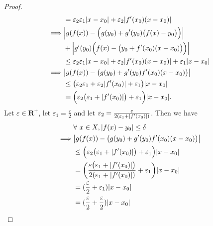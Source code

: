 \begin{proof}
\begin{align*}
                 & = \varepsilon_2 \varepsilon_1 \abs*{x - x_0} + \varepsilon_2 \abs*{f'(x_0)(x - x_0)}                                   \\
        \implies & \abs*{g(f(x)) - \Big(g(y_0) + g'(y_0)\big(f(x) - y_0\big)\Big)}                                                        \\
                 & + \abs*{g'(y_0) \Big(f(x) - \big(y_0 + f'(x_0)(x - x_0)\big)\Big)}                                                     \\
                 & \leq \varepsilon_2 \varepsilon_1 \abs*{x - x_0} + \varepsilon_2 \abs*{f'(x_0)(x - x_0)} + \varepsilon_1 \abs*{x - x_0} \\
        \implies & \abs*{g(f(x)) - \big(g(y_0) + g'(y_0) f'(x_0) (x - x_0)\big)}                                                          \\
                 & \leq \big(\varepsilon_2 \varepsilon_1 + \varepsilon_2 \abs*{f'(x_0)} + \varepsilon_1\big) \abs*{x - x_0}               \\
                 & = \Big(\varepsilon_2 \big(\varepsilon_1 + \abs*{f'(x_0)}\big) + \varepsilon_1\Big) \abs*{x - x_0}.
    \end{align*}
    Let \(\varepsilon \in \mathbf{R}^+\), let \(\varepsilon_1 = \frac{\varepsilon}{2}\) and let \(\varepsilon_2 = \frac{\varepsilon}{2(\varepsilon_1 + \abs*{f'(x_0)})}\).
    Then we have
    \begin{align*}
                 & \forall\ x \in X, \abs*{f(x) - y_0} \leq \delta                                                                                             \\
        \implies & \abs*{g(f(x)) - \big(g(y_0) + g'(y_0) f'(x_0) (x - x_0)\big)}                                                                               \\
                 & \leq \Big(\varepsilon_2 \big(\varepsilon_1 + \abs*{f'(x_0)}\big) + \varepsilon_1\Big) \abs*{x - x_0}                                        \\
                 & = \bigg(\frac{\varepsilon \big(\varepsilon_1 + \abs*{f'(x_0)}\big)}{2(\varepsilon_1 + \abs*{f'(x_0)})} + \varepsilon_1\bigg) \abs*{x - x_0} \\
                 & = (\frac{\varepsilon}{2} + \varepsilon_1) \abs*{x - x_0}                                                                                    \\
                 & = (\frac{\varepsilon}{2} + \frac{\varepsilon}{2}) \abs*{x - x_0}                                                                            \\

\end{align*}
\end{proof}

